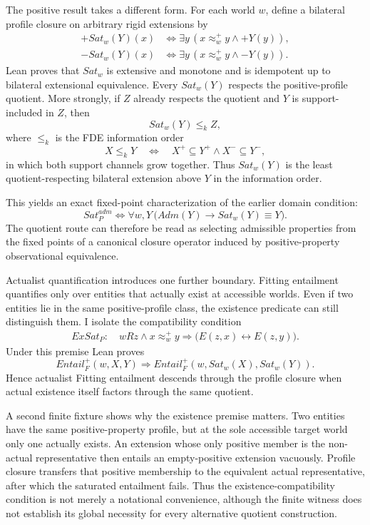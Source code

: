 The positive result takes a different form. For each world \(w\), define a bilateral profile closure on arbitrary rigid extensions by
\[
\begin{aligned}
  +Sat_w(Y)(x)
  &\Longleftrightarrow
  \exists y\,(x\approx_w^+y\land +Y(y)),\\
  -Sat_w(Y)(x)
  &\Longleftrightarrow
  \exists y\,(x\approx_w^+y\land -Y(y)).
\end{aligned}
\]
Lean proves that \(Sat_w\) is extensive and monotone and is idempotent up to bilateral extensional equivalence. Every \(Sat_w(Y)\) respects the positive-profile quotient. More strongly, if \(Z\) already respects the quotient and \(Y\) is support-included in \(Z\), then
\[
  Sat_w(Y)\leq_kZ,
\]
where \(\leq_k\) is the FDE information order
\[
  X\leq_kY
  \quad\Longleftrightarrow\quad
  X^{+}\subseteq Y^{+}\land X^{-}\subseteq Y^{-},
\]
in which both support channels grow together. Thus \(Sat_w(Y)\) is the least quotient-respecting bilateral extension above \(Y\) in the information order.

This yields an exact fixed-point characterization of the earlier domain condition:
\[
\boxed{
  Sat_P^{adm}
  \Longleftrightarrow
  \forall w,Y\,
  \bigl(Adm(Y)\rightarrow Sat_w(Y)\equiv Y\bigr).
}
\]
The quotient route can therefore be read as selecting admissible properties from the fixed points of a canonical closure operator induced by positive-property observational equivalence.

Actualist quantification introduces one further boundary. Fitting entailment quantifies only over entities that actually exist at accessible worlds. Even if two entities lie in the same positive-profile class, the existence predicate can still distinguish them. I isolate the compatibility condition
\[
\begin{split}
  ExSat_P:\quad
  wRz\land x\approx_w^+y
  \Longrightarrow
  \bigl(E(z,x)\leftrightarrow E(z,y)\bigr).
\end{split}
\]
Under this premise Lean proves
\[
\boxed{
  Entail_F^+(w,X,Y)
  \Longrightarrow
  Entail_F^+(w,Sat_w(X),Sat_w(Y)).
}
\]
Hence actualist Fitting entailment descends through the profile closure when actual existence itself factors through the same quotient.

A second finite fixture shows why the existence premise matters. Two entities have the same positive-property profile, but at the sole accessible target world only one actually exists. An extension whose only positive member is the non-actual representative then entails an empty-positive extension vacuously. Profile closure transfers that positive membership to the equivalent actual representative, after which the saturated entailment fails. Thus the existence-compatibility condition is not merely a notational convenience, although the finite witness does not establish its global necessity for every alternative quotient construction.

